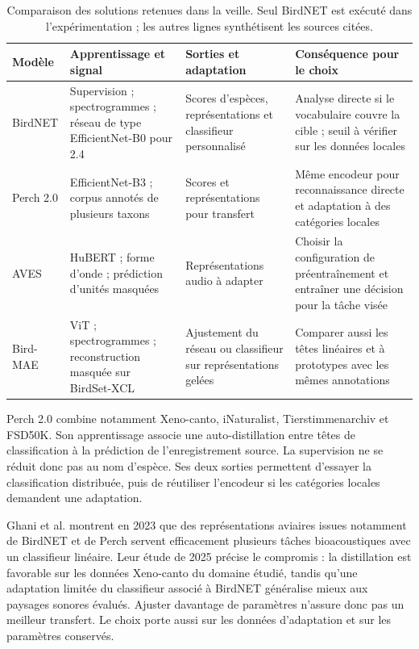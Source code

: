 \documentclass{technology_watch}
\begin{document}
\begin{table}[!t]
\centering\small
\caption{Comparaison des solutions retenues dans la veille. Seul BirdNET est
exécuté dans l'expérimentation ; les autres lignes synthétisent les sources citées.}
\label{tab:technologies}
\begin{tabularx}{\textwidth}{@{}>{\raggedright\arraybackslash}p{1.8cm}YYY@{}}
\toprule
Modèle & Apprentissage et signal & Sorties et adaptation & Conséquence pour le choix \\
\midrule
BirdNET\newline\cite{kahl2021,birdnetmodels} & Supervision ; spectrogrammes ;
réseau de type EfficientNet-B0 pour 2.4 & Scores d'espèces, représentations
et classifieur personnalisé & Analyse directe si le vocabulaire couvre
la cible ; seuil à vérifier sur les données locales \\
Perch 2.0\newline\cite{perch2025} & EfficientNet-B3 ; corpus annotés de
plusieurs taxons & Scores et représentations pour transfert & Même encodeur
pour reconnaissance directe et adaptation à des catégories locales \\
AVES\newline\cite{aves2023} & HuBERT ; forme d'onde ; prédiction d'unités
masquées & Représentations audio à adapter & Choisir la configuration de
préentraînement et entraîner une décision pour la tâche visée \\
Bird-MAE\newline\cite{birdmae2025} & ViT ; spectrogrammes ; reconstruction
masquée sur BirdSet-XCL & Ajustement du réseau ou classifieur sur
représentations gelées & Comparer aussi les têtes linéaires et à prototypes
avec les mêmes annotations \\
\bottomrule
\end{tabularx}
\end{table}

Perch 2.0 combine notamment Xeno-canto, iNaturalist, Tierstimmenarchiv et
FSD50K. Son apprentissage associe une auto-distillation entre têtes de
classification à la prédiction de l'enregistrement source\cite{perch2025}.
La supervision ne se réduit donc pas au nom d'espèce. Ses deux sorties
permettent d'essayer la classification distribuée, puis de réutiliser
l'encodeur si les catégories locales demandent une adaptation.

Ghani et al. montrent en 2023 que des représentations aviaires issues notamment
de BirdNET et de Perch servent efficacement plusieurs tâches bioacoustiques
avec un classifieur linéaire\cite{ghani2023}. Leur étude de 2025 précise le
compromis : la distillation est favorable sur les données Xeno-canto du domaine
étudié, tandis qu'une adaptation limitée du classifieur associé à BirdNET
généralise mieux aux paysages sonores évalués\cite{ghani2025}. Ajuster davantage
de paramètres n'assure donc pas un meilleur transfert. Le choix porte aussi sur
les données d'adaptation et sur les paramètres conservés.
\end{document}
